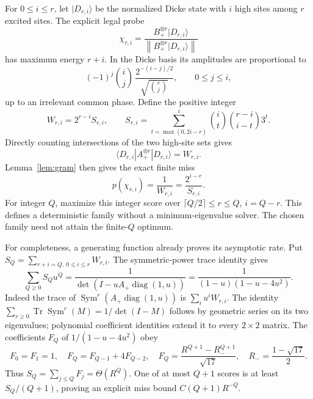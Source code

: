 \documentclass[11pt,a4paper]{article}
\theoremstyle{remark}
\DeclareMathOperator{\Tr}{Tr}
\DeclareMathOperator{\Sym}{Sym}
\newcommand{\ket}[1]{|#1\rangle}
\newcommand{\bra}[1]{\langle #1|}
\newcommand{\norm}[1]{\left\|#1\right\|}
\begin{document}
For \(0\leq i\leq r\), let \(\ket{D_{r,i}}\) be the normalized Dicke
state with \(i\) high sites among \(r\) excited sites.
The explicit legal probe
\[
 \chi_{r,i}=\frac{B_+^{\otimes r}\ket{D_{r,i}}}
                  {\norm{B_+^{\otimes r}\ket{D_{r,i}}}}
\]
has maximum energy \(r+i\). In the Dicke basis its amplitudes are
proportional to
\[
 (-1)^j\binom ij\,\frac{2^{-(i-j)/2}}{\sqrt{\binom rj}},
 \qquad 0\leq j\leq i,
\]
up to an irrelevant common phase. Define the positive integer
\begin{equation}\label{eq:score}
 W_{r,i}=2^{r-i}S_{r,i},\qquad
 S_{r,i}=\sum_{t=\max(0,2i-r)}^i
                 \binom it\binom{r-i}{i-t}3^t .
\end{equation}
Directly counting intersections of the two high-site sets gives
\[
 \bra{D_{r,i}}A_+^{\otimes r}\ket{D_{r,i}}=W_{r,i}.
\]
Lemma~\ref{lem:gram} then gives the exact finite miss
\begin{equation}\label{eq:explicitmiss}
 p(\chi_{r,i})=\frac1{W_{r,i}}=\frac{2^{i-r}}{S_{r,i}}.
\end{equation}
For integer \(Q\), maximize this integer score over
\(\lceil Q/2\rceil\leq r\leq Q\), \(i=Q-r\).
This defines a deterministic family without a minimum-eigenvalue solver.
The chosen family need not attain the finite-\(Q\) optimum.

For completeness, a generating function already proves its asymptotic
rate. Put \(S_Q=\sum_{r+i=Q,\ 0\leq i\leq r}W_{r,i}\).
The symmetric-power trace identity gives
\begin{equation}\label{eq:gen}
 \sum_{Q\geq0}S_Qu^Q
 =\frac1{\det(I-uA_+\operatorname{diag}(1,u))}
 =\frac1{(1-u)(1-u-4u^2)}.
\end{equation}
Indeed the trace of \(\Sym^r(A_+\operatorname{diag}(1,u))\) is
\(\sum_i u^iW_{r,i}\).
The identity \(\sum_{r\geq0}\Tr\Sym^r(M)=1/\det(I-M)\) follows by
geometric series on its two eigenvalues; polynomial coefficient identities
extend it to every \(2\times2\) matrix.
The coefficients \(F_Q\) of \(1/(1-u-4u^2)\) obey
\[
 F_0=F_1=1,\quad F_Q=F_{Q-1}+4F_{Q-2},\quad
 F_Q=\frac{R^{Q+1}-R_-^{Q+1}}{\sqrt{17}},
 \quad R_-=\frac{1-\sqrt{17}}2.
\]
Thus \(S_Q=\sum_{j\leq Q}F_j=\Theta(R^Q)\).
One of at most \(Q+1\) scores is at least \(S_Q/(Q+1)\), proving an
explicit miss bound \(C(Q+1)R^{-Q}\).
\end{document}
